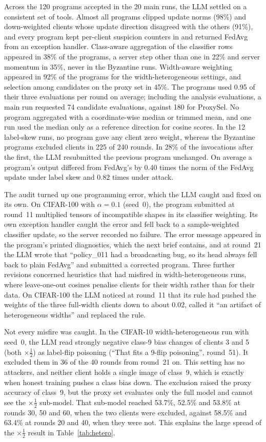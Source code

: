 \documentclass[3p,times,a4paper]{elsarticle}
\newcommand{\code}[1]{\texttt{\detokenize{#1}}}
\begin{document}
Across the 120 programs accepted in the 20 main runs, the LLM settled on a consistent set of tools. Almost all programs clipped update norms (98\%) and down-weighted clients whose update direction disagreed with the others (91\%), and every program kept per-client suspicion counters in \code{ctx.memory} and returned FedAvg from an exception handler. Class-aware aggregation of the classifier rows appeared in 38\% of the programs, a server step other than one in 22\% and server momentum in 35\%, never in the Byzantine runs. Width-aware weighting appeared in 92\% of the programs for the width-heterogeneous settings, and selection among candidates on the proxy set in 45\%. The programs used 0.95 of their three evaluations per round on average; including the analysis evaluations, a main run requested 74 candidate evaluations, against 180 for ProxySel. No program aggregated with a coordinate-wise median or trimmed mean, and one run used the median only as a reference direction for cosine scores. In the 12 label-skew runs, no program gave any client zero weight, whereas the Byzantine programs excluded clients in 225 of 240 rounds. In 28\% of the invocations after the first, the LLM resubmitted the previous program unchanged. On average a program's output differed from FedAvg's by 0.40 times the norm of the FedAvg update under label skew and 0.82 times under attack.

The audit turned up one programming error, which the LLM caught and fixed on its own. On CIFAR-100 with $\alpha=0.1$ (seed~0), the program submitted at round~11 multiplied tensors of incompatible shapes in its classifier weighting. Its own exception handler caught the error and fell back to a sample-weighted classifier update, so the server recorded no failure. The error message appeared in the program's printed diagnostics, which the next brief contains, and at round~21 the LLM wrote that ``policy\_011 had a broadcasting bug, so its head always fell back to plain FedAvg'' and submitted a corrected program. Three further revisions concerned heuristics that had misfired in width-heterogeneous runs, where leave-one-out cosines penalise clients for their width rather than for their data. On CIFAR-100 the LLM noticed at round~11 that its rule had pushed the weights of the three full-width clients down to about 0.02, called it ``an artifact of heterogeneous widths'' and replaced the rule.

Not every misfire was caught. In the CIFAR-10 width-heterogeneous run with seed~0, the LLM read strongly negative class-9 bias changes of clients 3 and 5 (both $\times\frac12$) as label-flip poisoning (``That fits a 9-flip poisoning'', round~51). It excluded them in 36 of the 40 rounds from round~21 on. This setting has no attackers, and neither client holds a single image of class~9, which is exactly when honest training pushes a class bias down. The exclusion raised the proxy accuracy of class~9, but the proxy set evaluates only the full model and cannot see the $\times\frac12$ sub-model. That sub-model reached 53.7\%, 52.5\% and 53.8\% at rounds 30, 50 and 60, when the two clients were excluded, against 58.5\% and 63.4\% at rounds 20 and 40, when they were not. This explains the large spread of the $\times\frac12$ result in Table~\ref{tab:hetero}.
\end{document}
